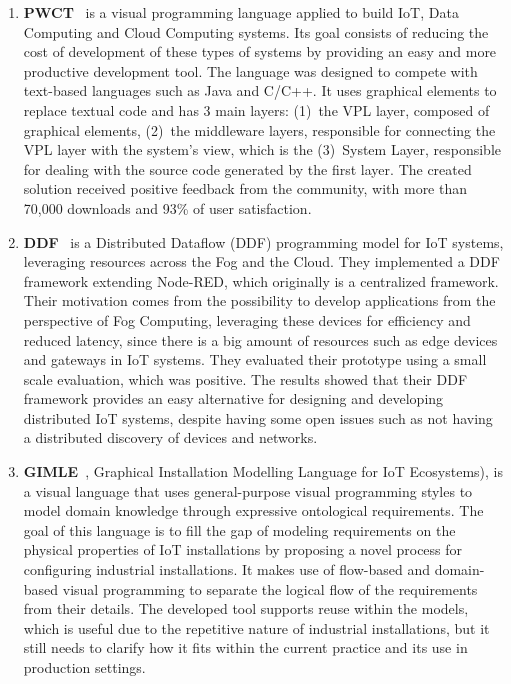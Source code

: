 \begin{enumerate}
    \item \textbf{PWCT}~\cite{pwct} is a visual programming language applied to build IoT, Data Computing and Cloud Computing systems. Its goal consists of reducing the cost of development of these types of systems by providing an easy and more productive development tool. The language was designed to compete with text-based languages such as Java and C/C++. It uses graphical elements to replace textual code and has 3 main layers: (1)~the VPL layer, composed of graphical elements, (2)~the middleware layers, responsible for connecting the VPL layer with the system's view, which is the (3)~System Layer, responsible for dealing with the source code generated by the first layer. The created solution received positive feedback from the community, with more than 70,000 downloads and 93\% of user satisfaction.
    \item \textbf{DDF}~\cite{ddf} is a Distributed Dataflow (DDF) programming model for IoT systems, leveraging resources across the Fog and the Cloud. They implemented a DDF framework extending Node-RED, which originally is a centralized framework. Their motivation comes from the possibility to develop applications from the perspective of Fog Computing, leveraging these devices for efficiency and reduced latency, since there is a big amount of resources such as edge devices and gateways in IoT systems. They evaluated their prototype using a small scale evaluation, which was positive. The results showed that their DDF framework provides an easy alternative for designing and developing distributed IoT systems, despite having some open issues such as not having a distributed discovery of devices and networks.
    \item \textbf{GIMLE}~\cite{gimle}, Graphical Installation Modelling Language for IoT Ecosystems), is a visual language that uses general-purpose visual programming styles to model domain knowledge through expressive ontological requirements. The goal of this language is to fill the gap of modeling requirements on the physical properties of IoT installations by proposing a novel process for configuring industrial installations. It makes use of flow-based and domain-based visual programming to separate the logical flow of the requirements from their details. The developed tool supports reuse within the models, which is useful due to the repetitive nature of industrial installations, but it still needs to clarify how it fits within the current practice and its use in production settings.

\end{enumerate}
